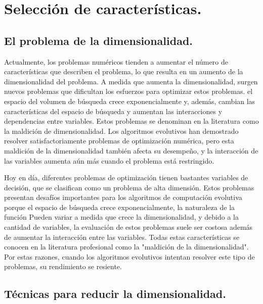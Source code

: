\documentclass[12pt,letterpaper]{report}
\begin{document}
\setcounter{chapter}{2}
\setcounter{section}{2}
\section{Selección de características.}\label{cap.seleccion_caracteristicas}

\subsection{ El problema de la dimensionalidad.}

Actualmente, los problemas numéricos tienden a aumentar el número de características que describen el problema, lo que resulta en un aumento de la dimensionalidad del problema. A medida que aumenta la dimensionalidad, surgen nuevos problemas que dificultan los esfuerzos para optimizar estos problemas. el espacio del volumen de búsqueda crece exponencialmente y, además, cambian las características del espacio de búsqueda y aumentan las interacciones y dependencias entre variables. Estos problemas se denominan en la literatura como la maldición de dimensionalidad. Los algoritmos evolutivos han demostrado resolver satisfactoriamente problemas de optimización numérica, pero esta maldición de la dimensionalidad también afecta su desempeño, y la interacción de las variables aumenta aún más cuando el problema está restringido.

Hoy en día, diferentes problemas de optimización tienen bastantes variables de decisión, que se clasifican
como un problema de alta dimensión. Estos problemas presentan desafíos importantes para los algoritmos de computación evolutiva porque el espacio de búsqueda crece exponencialmente, la naturaleza de la función
Pueden variar a medida que crece la dimensionalidad, y debido a la cantidad de variables, la evaluación de estos problemas suele ser costosa además de aumentar la interacción entre las variables. Todas estas características se conocen en la literatura profesional como la "maldición de la dimensionalidad". Por estas razones, cuando los algoritmos evolutivos intentan resolver este tipo de problemas, su rendimiento se resiente.

\subsection{ Técnicas para reducir la dimensionalidad.} 
\end{document}

